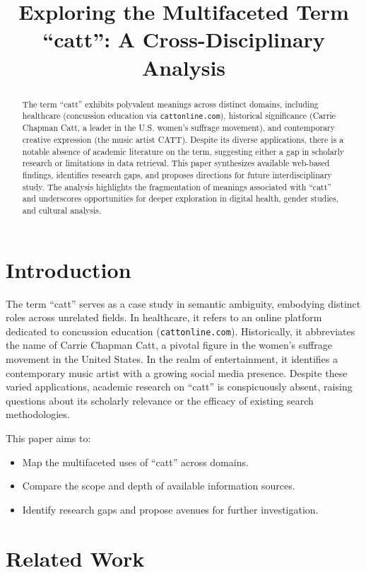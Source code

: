 \documentclass{article}
\title{Exploring the Multifaceted Term ``catt'': A Cross-Disciplinary Analysis}
\author{}
\date{}
\begin{document}
\maketitle

\begin{abstract}
The term ``catt'' exhibits polyvalent meanings across distinct domains, including healthcare (concussion education via \texttt{cattonline.com}), historical significance (Carrie Chapman Catt, a leader in the U.S. women's suffrage movement), and contemporary creative expression (the music artist CATT). Despite its diverse applications, there is a notable absence of academic literature on the term, suggesting either a gap in scholarly research or limitations in data retrieval. This paper synthesizes available web-based findings, identifies research gaps, and proposes directions for future interdisciplinary study. The analysis highlights the fragmentation of meanings associated with ``catt'' and underscores opportunities for deeper exploration in digital health, gender studies, and cultural analysis.
\end{abstract}

\section{Introduction}
The term ``catt'' serves as a case study in semantic ambiguity, embodying distinct roles across unrelated fields. In healthcare, it refers to an online platform dedicated to concussion education (\texttt{cattonline.com}). Historically, it abbreviates the name of Carrie Chapman Catt, a pivotal figure in the women's suffrage movement in the United States. In the realm of entertainment, it identifies a contemporary music artist with a growing social media presence. Despite these varied applications, academic research on ``catt'' is conspicuously absent, raising questions about its scholarly relevance or the efficacy of existing search methodologies.

This paper aims to:
\begin{itemize}
    \item Map the multifaceted uses of ``catt'' across domains.
    \item Compare the scope and depth of available information sources.
    \item Identify research gaps and propose avenues for further investigation.
\end{itemize}

\section{Related Work}
\end{document}
